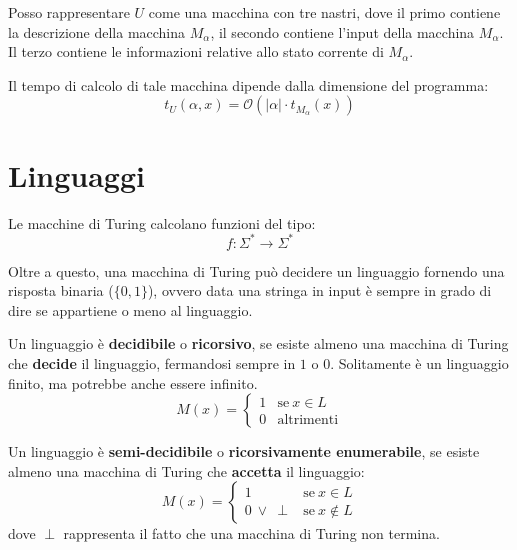 Posso rappresentare $U$ come una macchina con tre nastri, dove il primo contiene 
la descrizione della macchina $M_{\alpha}$, il secondo contiene l'input della macchina
$M_{\alpha}$. Il terzo contiene le informazioni relative allo stato corrente di $M_{\alpha}$.

Il tempo di calcolo di tale macchina dipende dalla dimensione del programma:
\begin{equation}
    t_U(\alpha, x) = \mathcal{O}(|\alpha| \cdot t_{M_{\alpha}}(x))
\end{equation}
\section{Linguaggi}
Le macchine di Turing calcolano funzioni del tipo:
\begin{equation}
    f: \Sigma^{\ast} \to \Sigma^{\ast}
\end{equation}

Oltre a questo, una macchina di Turing può decidere un linguaggio fornendo una
 risposta binaria ($\{0, 1\}$), ovvero data una stringa in input è sempre in grado 
 di dire se appartiene o meno al linguaggio.
\begin{definizione} 
    Un linguaggio è \textbf{decidibile} o \textbf{ricorsivo}, se esiste almeno
     una macchina di Turing che \textbf{decide} il linguaggio, fermandosi sempre
      in $1$ o $0$. Solitamente è un linguaggio finito, ma potrebbe anche essere infinito.
    \begin{equation}
        M(x) = \begin{cases}
        1 & \text{se} \ x \in L \\
        0 & \text{altrimenti}
    \end{cases}
    \end{equation}
\end{definizione}
\begin{definizione} 
    Un linguaggio è \textbf{semi-decidibile} o \textbf{ricorsivamente enumerabile}, 
    se esiste almeno una macchina di Turing che \textbf{accetta} il linguaggio:
    \begin{equation}
        M(x) = \begin{cases}
            1 & \text{se} \ x \in L \\
            0 \ \lor \ \perp & \text{se} \ x \notin L 
        \end{cases}
    \end{equation}
    dove $\perp$ rappresenta il fatto che una macchina di Turing non termina.
\end{definizione}

